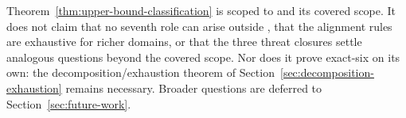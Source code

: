 \begin{remark}\label{rem:classification-scope}
Theorem~\ref{thm:upper-bound-classification} is scoped to \FATCD{}
and its covered scope. It does not claim that no seventh role can
arise outside \FATCD{}, that the alignment rules are exhaustive for
richer domains, or that the three threat closures settle analogous
questions beyond the covered scope. Nor does it prove exact-six on
its own: the decomposition/exhaustion theorem of
Section~\ref{sec:decomposition-exhaustion} remains necessary. Broader
questions are deferred to Section~\ref{sec:future-work}.
\end{remark}
